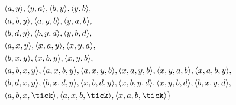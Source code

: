 \documentclass{scrreprt}
\begin{document}
\begin{align*}
&\hspace{0.7cm}\langle a, y \rangle, \langle y, a \rangle,
               \langle b, y \rangle, \langle y, b \rangle,\\
&\hspace{0.7cm}\langle a, b, y \rangle, \langle a, y, b \rangle, \langle y, a, b \rangle,\\
&\hspace{0.7cm}\langle b, d, y \rangle, \langle b, y, d \rangle, \langle y, b, d \rangle,\\
&\hspace{0.7cm}\langle a, x, y \rangle, \langle x, a, y \rangle, \langle x, y, a \rangle,\\
&\hspace{0.7cm}\langle b, x, y \rangle, \langle x, b, y \rangle, \langle x, y, b \rangle,\\
&\hspace{0.7cm}\langle a, b, x, y \rangle, \langle a, x, b, y \rangle, \langle a, x, y, b \rangle,
               \langle x, a, y, b \rangle, \langle x, y, a, b \rangle, \langle x, a, b, y \rangle,\\
&\hspace{0.7cm}\langle b, d, x, y \rangle, \langle b, x, d, y \rangle, \langle x, b, d, y \rangle,
               \langle x, b, y, d \rangle, \langle x, y, b, d \rangle, \langle b, x, y, d \rangle,\\
&\hspace{0.7cm}\langle a, b, x, \tick \rangle, \langle a, x, b, \tick \rangle, \langle x, a, b, \tick \rangle
\}
\end{align*}
\end{document}
